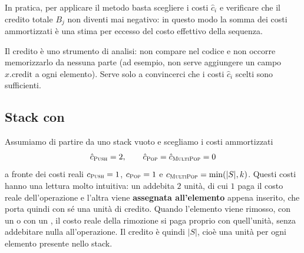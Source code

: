 In pratica, per applicare il metodo basta scegliere i costi $\hat{c}_i$ e verificare che il credito totale $B_j$ non diventi mai negativo: in questo modo la somma dei costi ammortizzati è una stima per eccesso del costo effettivo della sequenza.

\begin{osservazione}
Il credito è uno strumento di analisi: non compare nel codice e non occorre memorizzarlo da nessuna parte (ad esempio, non serve aggiungere un campo $x.\mathrm{credit}$ a ogni elemento). Serve solo a convincerci che i costi $\hat{c}_i$ scelti sono sufficienti.
\end{osservazione}

\subsection{Stack con \MultiPop}
Assumiamo di partire da uno stack vuoto e scegliamo i costi ammortizzati
\[
\hat{c}_{\textsc{Push}} = 2, \qquad \hat{c}_{\textsc{Pop}} = \hat{c}_{\textsc{MultiPop}} = 0
\]
a fronte dei costi reali $c_{\textsc{Push}} = 1$, $c_{\textsc{Pop}} = 1$ e $c_{\textsc{MultiPop}} = \min(|S|,k)$. Questi costi hanno una lettura molto intuitiva: un \Push{} addebita $2$ unità, di cui $1$ paga il costo reale dell'operazione e l'altra viene \textbf{assegnata all'elemento} appena inserito, che porta quindi con sé una unità di credito. Quando l'elemento viene rimosso, con un \Pop{} o con un \MultiPop, il costo reale della rimozione si paga proprio con quell'unità, senza addebitare nulla all'operazione. Il credito è quindi $|S|$, cioè una unità per ogni elemento presente nello stack.

